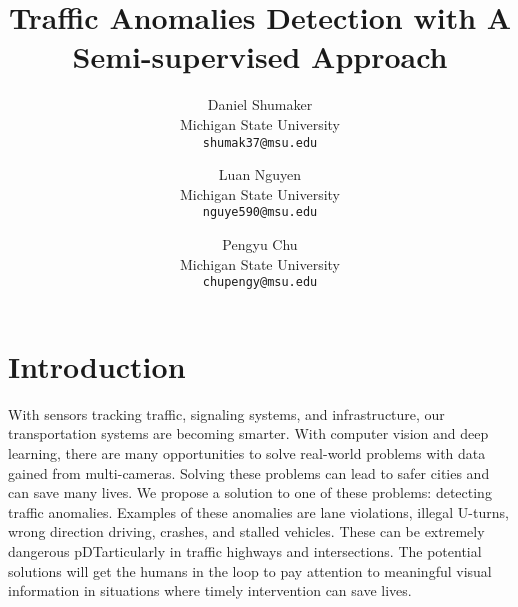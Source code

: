 \documentclass[10pt,twocolumn,letterpaper]{article}
\begin{document}
\title{Traffic Anomalies Detection with A Semi-supervised Approach}
\author{Daniel Shumaker\\
Michigan State University\\
{\tt\small shumak37@msu.edu}
\and
Luan Nguyen\\
Michigan State University\\
{\tt\small nguye590@msu.edu}
\and
Pengyu Chu\\
Michigan State University\\
{\tt\small chupengy@msu.edu}
}

\maketitle


\section{Introduction}

With sensors tracking traffic, signaling systems, and infrastructure, our transportation systems are becoming smarter.
With computer vision and deep learning, there are many opportunities to solve real-world problems with data gained from multi-cameras.
Solving these problems can lead to safer cities and can save many lives.
We propose a solution to one of these problems: detecting traffic anomalies. Examples of these anomalies are lane violations, illegal U-turns, wrong direction driving, crashes, and stalled vehicles.
These can be extremely dangerous pDTarticularly in traffic highways and intersections. The potential solutions will get the humans in the loop to pay attention to meaningful visual information in situations where timely intervention can save lives.\cite{naphade2017nvidia}
\end{document}
